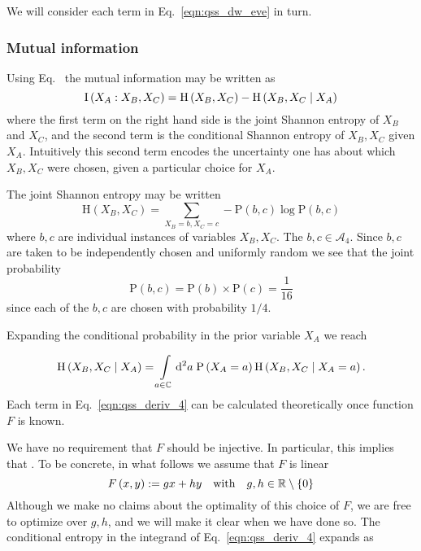 We will consider each term in Eq.~\ref{eqn:qss_dw_eve} in turn.

\subsubsection{Mutual information}

Using Eq.~ the mutual information may be written as 
\begin{equation}\label{eqn:qss_deriv_1}
\text{I}\left(X_A : X_B, X_C\right) = \text{H}\left(X_B, X_C\right) - \text{H} \left(X_B, X_C \; \middle| \; X_A\right)
\end{equation}
where the first term on the right hand side is the joint Shannon entropy of $X_B$ and $X_C$, and the second term is the conditional Shannon entropy of $X_B, X_C$ given $X_A$. Intuitively this second term encodes the uncertainty one has about which $X_B, X_C$ were chosen, given a particular choice for $X_A$. 

The joint Shannon entropy may be written
\begin{equation}\label{eqn:qss_deriv_2}
\text{H}\left(X_B, X_C\right) = \sum_{X_B=b, X_C=c} - \text{P}\left(b, c\right) \log \text{P}\left(b, c\right)
\end{equation}
where $b, c$ are individual instances of variables $X_B, X_C$. The $b, c \in \mathcal{A}_4$. Since $b, c$ are taken to be independently chosen and uniformly random we see that the joint probability
\begin{equation}\label{eqn:qss_deriv_3}
\text{P}\left(b, c\right) = \text{P}\left(b\right)\times \text{P}\left(c\right) = \frac{1}{16}
\end{equation}
since each of the $b, c$ are chosen with probability $1/4$. 

Expanding the conditional probability in the prior  variable $X_A$ we reach

\begin{equation}\label{eqn:qss_deriv_4}
\text{H}\left(X_B, X_C \; \middle| \; X_A\right) = \int\limits_{a \in \mathbb{C}} \mathop{}\!\mathrm{d^2} a \; \text{P}\left(X_A = a\right) \text{H}\left(X_B, X_C \; \middle| \; X_A = a\right).
\end{equation}
Each term in Eq.~\ref{eqn:qss_deriv_4} can be calculated theoretically once function $F$ is known. 

We have no requirement that $F$ should be injective. In particular, this implies that . To be concrete, in what follows we assume that $F$ is linear
\begin{equation}\label{eqn:qss_F_linear}
F\left(x, y\right) := g x + h y \qq{with} g, h \in \mathbb{R}\setminus \left\{0\right\}
\end{equation} 
Although we make no claims about the optimality of this choice of $F$, we are free to optimize over $g, h$, and we will make it clear when we have done so. The conditional entropy in the integrand of Eq.~\ref{eqn:qss_deriv_4} expands as 

